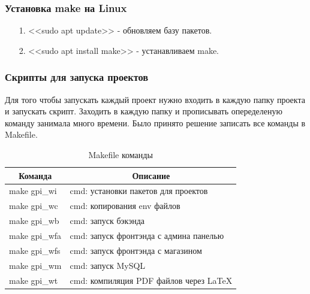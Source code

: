 
\subsubsection*{Установка make на Linux}

\begin{itemize}
    \item[1.] <<sudo apt update>> - обновляем базу пакетов.
    \item[2.] <<sudo apt install make>> - устанавливаем make.
\end{itemize}

\newpage


\subsubsection*{Скрипты для запуска проектов}

Для того чтобы запускать каждый проект нужно входить в каждую папку проекта и запускать скрипт.
Заходить в каждую папку и прописывать опеределеную команду занимала много времени.
Было принято решение записать все команды в Makefile.

\begin{table}[!h]
    \centering
    \caption{Makefile команды}
    \begin{tabular}{|p{4cm}|p{12cm}|}

                                                                                       \hline
\multicolumn{1}{|c|}{\textbf{Команда}} & \multicolumn{1}{c|}{\textbf{Описание}}     \\ \hline
make gpi\_wi    & cmd: установки пакетов для проектов       \\ \hline 
make gpi\_wc    & cmd: копирования env файлов               \\ \hline  
make gpi\_wb    & cmd: запуск бэкэнда                       \\ \hline
make gpi\_wfa   & cmd: запуск фронтэнда с админа панелью    \\ \hline
make gpi\_wfs   & cmd: запуск фронтэнда с магазином         \\ \hline
make gpi\_wm    & cmd: запуск MySQL                         \\ \hline
make gpi\_wt    & cmd: компиляция PDF файлов через LaTeX    \\ \hline

    \end{tabular}
\end{table}

